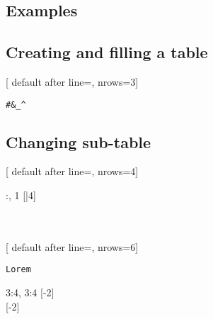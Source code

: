 \documentclass{l3doc}
\begin{document}
\begin{documentation}
\section{Examples}

\subsection{Creating and filling a table}

\begin{tablesample}
[
    default after line=\hline, 
    nrows=3]
\begin{lptfill}{}
\verb|#&_^|
\end{lptfill}
\LPTUseTable
\end{tablesample}


\subsection{Changing sub-table}

\begin{tablesample}
[
    default after line=, 
    nrows=4]
\begin{lptview}{:, 1}
{  }[|4] \\ \\ \\
\end{lptview}
\LPTUseTable
\end{tablesample}

\begin{tablesample}
[
    default after line=\hline, 
    nrows=6]
\begin{lptfill}{}
\verb|Lorem|
\end{lptfill}
\begin{lptview}{3:4, 3:4}
{  }[-2]\\
{  }[-2]
\end{lptview}
\LPTUseTable
\end{tablesample}


\end{documentation}
\end{document}
